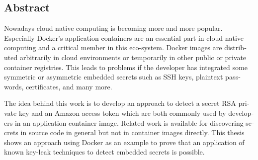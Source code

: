 
\begin{otherlanguage}{american}
\chapter*{Abstract}
Nowadays cloud native computing is becoming more and more popular. Especially Docker’s application containers are an essential part in cloud native computing and a critical member in this eco-system. 
Docker images are distributed arbitrarily in cloud environments or temporarily in other public or private container registries. This leads to problems if the developer has integrated some symmetric or asymmetric embedded secrets such as SSH keys, plaintext passwords, certificates, and many more.

The idea behind this work is to develop an approach to detect a secret RSA private key and an Amazon access token which are both commonly used by developers in an application container image. Related work is available for discovering secrets in source code in general but not in container images directly. This thesis shows an approach using Docker as an example to prove that an application of known key-leak techniques to detect embedded secrets is possible.
\end{otherlanguage}